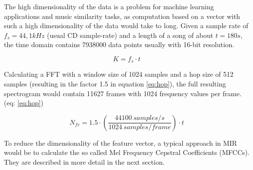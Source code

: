 The high dimensionality of the data is a problem for machine learning applications and music similarity tasks, as computation based on a vector with such a high dimensionality of the data would take to long.
Given a sample rate of $f_s = 44,1kHz$ (usual CD sample-rate) and a length of a song of about $t = 180s$, the time domain contains 7938000 data points usually with 16-bit resolution. 

\begin{equation} \label{eq:points}
K = f_s \cdot t
\end{equation}

Calculating a FFT with a window size of 1024 samples and a hop size of 512 samples (resulting in the factor 1.5 in equation \ref{eq:hop})\cite{knees1}, the full resulting spectrogram would contain 11627 frames with 1024 frequency values per frame. (eq: \ref{eq:hop}) 

\begin{equation} \label{eq:hop}
N_{fv} = 1.5 \cdot (\frac{44100 \ samples/s}{1024 \ samples/frame}) \cdot t
\end{equation}

To reduce the dimensionality of the feature vector, a typical approach in MIR would be to calculate the so called Mel Frequency Cepstral Coefficients (MFCCs). They are described in more detail in the next section.

